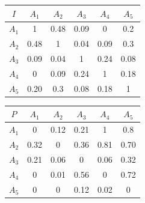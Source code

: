 \documentclass[a5paper,doc,10pt,noapacite]{apa6}
\begin{document}
{{\begin{table}[H]
   \fontsize{7}{11}\selectfont
    \begin{minipage}{.5\linewidth}
      \centering
	\begin{tabular}{c|ccccc} \thickline
	\(I\) & \(A_1\) & \(A_2\) & \(A_3\) & \(A_4\) & \(A_5\)  \\ \hline
    \(A_1\) & 1 & 0.48 & 0.09 & 0 & 0.2  \\
    \(A_2\) & 0.48 & 1 & 0.04 & 0.09 & 0.3  \\
	\(A_3\) & 0.09 & 0.04 & 1 & 0.24 & 0.08   \\
	\(A_4\) & 0 & 0.09 & 0.24 & 1 & 0.18   \\
	\(A_5\) & 0.20 & 0.3 & 0.08 & 0.18 & 1   \\
\end{tabular}
\label{tab:B4} 
    \end{minipage}%
    \begin{minipage}{.5\linewidth}
      \centering
	\begin{tabular}{c|ccccc} \thickline
	\(P\) & \(A_1\) & \(A_2\) & \(A_3\) & \(A_4\) & \(A_5\)  \\ \hline
    \(A_1\) & 0 & 0.12 & 0.21 & 1 & 0.8  \\
    \(A_2\) & 0.32 & 0 & 0.36 & 0.81 & 0.70  \\
	\(A_3\) & 0.21 & 0.06 & 0 & 0.06 & 0.32   \\
	\(A_4\) & 0 & 0.01 & 0.56 & 0 & 0.72   \\
	\(A_5\) & 0 & 0 & 0.12 & 0.02 & 0   \\
\end{tabular}
\label{tab:B5} 
    \end{minipage} 
\end{table}

%

}}
\end{document}
